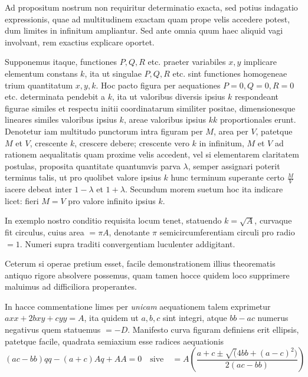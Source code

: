 Ad propositum nostrum non requiritur determinatio exacta, sed potius indagatio expressionis, quae ad multitudinem exactam quam prope velis accedere potest, dum limites in infinitum ampliantur. Sed ante omnia quum haec aliquid vagi involvant, rem exactius explicare oportet.

Supponemus itaque, functiones $P,Q,R$ etc. praeter variabiles $x,y$ implicare elementum constans $k$, ita ut singulae $P,Q,R$ etc. sint functiones homogeneae trium quantitatum $x,y,k$. Hoc pacto figura per aequationes $P=0,Q=0,R=0$ etc. determinata pendebit a $k$, ita ut valoribus diversis ipsius $k$ respondeant figurae similes et respectu initii coordinatarum similiter positae, dimensionesque lineares similes valoribus ipsius $k$, areae valoribus ipsius $kk$ proportionales erunt. Denotetur iam multitudo punctorum intra figuram per $M$, area per $V$, patetque $M$ et $V$, crescente $k$, crescere debere; crescente vero $k$ in infinitum, $M$ et $V$ ad rationem aequalitatis quam proxime velis accedent, vel si elementarem claritatem postulas, proposita quantitate quantumvis parva $\lambda$, semper assignari poterit terminus talis, ut pro quolibet valore ipsius $k$ hunc terminum superante certo $\frac MV$ iacere debeat inter $1-\lambda$ et $1+\lambda$. Secundum morem suetum hoc ita indicare licet: fieri $M=V$ pro valore infinito ipsius $k$.

In exemplo nostro conditio requisita locum tenet, statuendo $k=\surd A$, curvaque fit circulus, cuius area $=\pi A$, denotante $\pi$ semicircumferentiam circuli pro radio $=1$. Numeri supra traditi convergentiam luculenter addigitant.

Ceterum si operae pretium esset, facile demonstrationem illius theorematis antiquo rigore absolvere possemus, quam tamen hocce quidem loco supprimere maluimus ad difficiliora properantes.

In hacce commentatione limes per \emph{unicam} aequationem talem exprimetur $axx+2bxy+cyy=A$, ita quidem ut $a,b,c$ sint integri, atque $bb-ac$ numerus negativus quem statuemus $=-D$. Manifesto curva figuram definiens erit ellipsis, patetque facile, quadrata semiaxium esse radices aequationis
\[
(ac-bb)qq-(a+c)Aq+AA=0\quad\text{sive}\quad
=A\left(\frac{a+c\pm\surd(4bb+(a-c)^2)}{2(ac-bb)}\right)
\]


